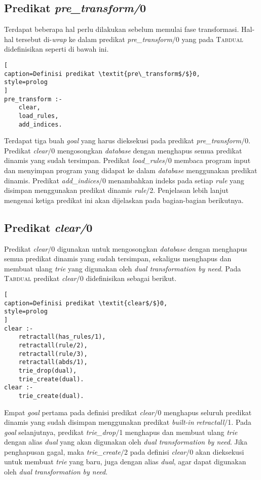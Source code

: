 \subsection{Predikat \textit{pre\_transform/}0}
\label{subsec:pre_transform}

Terdapat beberapa hal perlu dilakukan sebelum memulai fase transformasi. Hal-hal tersebut di-\textit{wrap} ke dalam predikat \textit{pre\_transform$/$}0 yang pada \textsc{Tabdual} didefinisikan seperti di bawah ini.
\\

\begin{lstlisting}[
caption=Definisi predikat \textit{pre\_transform$/$}0,
style=prolog
]
pre_transform :-
	clear,
	load_rules,
	add_indices.
\end{lstlisting}

Terdapat tiga buah \textit{goal} yang harus dieksekusi pada predikat \textit{pre\_transform$/$}0. Predikat \textit{clear$/$}0 mengosongkan \textit{database} dengan menghapus semua predikat dinamis yang sudah tersimpan. Predikat \textit{load\_rules$/$}0 membaca program input dan menyimpan program yang didapat ke dalam \textit{database} menggunakan predikat dinamis. Predikat \textit{add\_indices$/$}0 menambahkan indeks pada setiap \textit{rule} yang disimpan menggunakan predikat dinamis \textit{rule$/$}2. Penjelasan lebih lanjut mengenai ketiga predikat ini akan dijelaskan pada bagian-bagian berikutnya.

\subsection{Predikat \textit{clear/}0}

Predikat \textit{clear$/$}0 digunakan untuk mengosongkan \textit{database} dengan menghapus semua predikat dinamis yang sudah tersimpan, sekaligus menghapus dan membuat ulang \textit{trie} yang digunakan oleh \textit{dual transformation by need}. Pada \textsc{Tabdual} predikat \textit{clear$/$}0 didefinisikan sebagai berikut.
\\

\begin{lstlisting}[
caption=Definisi predikat \textit{clear$/$}0,
style=prolog
]
clear :-
	retractall(has_rules/1),
	retractall(rule/2),
	retractall(rule/3), 
	retractall(abds/1),
	trie_drop(dual),
	trie_create(dual).
clear :-
	trie_create(dual).
\end{lstlisting}

Empat \textit{goal} pertama pada definisi predikat \textit{clear$/$}0 menghapus seluruh predikat dinamis yang sudah disimpan menggunakan predikat \textit{built-in} \textit{retractall$/$}1. Pada \textit{goal} selanjutnya, predikat \textit{trie\_drop$/$}1 menghapus dan membuat ulang \textit{trie} dengan alias \textit{dual} yang akan digunakan oleh \textit{dual transformation by need}. Jika penghapusan gagal, maka \textit{trie\_create$/$}2 pada definisi \textit{clear$/$}0 akan dieksekusi untuk membuat \textit{trie} yang baru, juga dengan alias \textit{dual}, agar dapat digunakan oleh \textit{dual transformation by need}.

